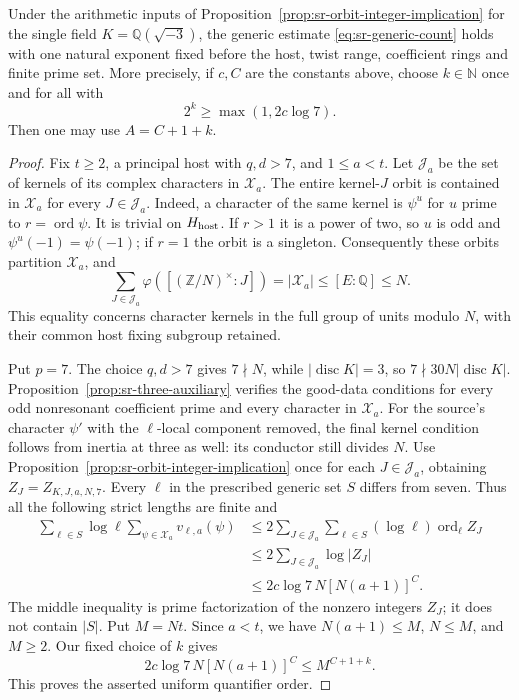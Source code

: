 \begin{srproposition}
\label{prop:sr-fixed-seven-generic}
Under the arithmetic inputs of
Proposition~\ref{prop:sr-orbit-integer-implication} for the single field
$K=\mathbb Q(\sqrt{-3})$, the generic estimate
\eqref{eq:sr-generic-count} holds with one natural exponent fixed
before the host, twist range, coefficient rings and finite prime set.
More precisely, if $c,C$ are the constants above, choose
$k\in\mathbb N$ once and for all with
\[
                2^k\ge\max(1,2c\log7).
\]
Then one may use $A=C+1+k$.
\end{srproposition}
\begin{proof}
Fix $t\ge2$, a principal host with $q,d>7$, and $1\le a<t$.
Let $\mathcal J_a$ be the set of kernels of its complex characters
in $\mathcal X_a$. The entire kernel-$J$ orbit is contained in
$\mathcal X_a$ for every $J\in\mathcal J_a$.
Indeed, a character of the same kernel is $\psi^u$ for $u$ prime to
$r=\operatorname{ord}\psi$. It is trivial on $H_{\rm host}$.
If $r>1$ it is a power of two, so $u$ is odd and
$\psi^u(-1)=\psi(-1)$; if $r=1$ the orbit is a singleton.
Consequently these orbits partition $\mathcal X_a$, and
\begin{equation}\label{eq:sr-orbit-totient-sum}
 \sum_{J\in\mathcal J_a}
           \varphi([(\mathbb Z/N)^\times:J])
             =|\mathcal X_a|\le[E:\mathbb Q]\le N.
\end{equation}
This equality concerns character kernels in the full group of units
modulo $N$, with their common host fixing subgroup retained.

Put $p=7$. The choice $q,d>7$ gives $7\nmid N$, while
$|\operatorname{disc}K|=3$, so $7\nmid30N|\operatorname{disc}K|$.
Proposition~\ref{prop:sr-three-auxiliary} verifies the good-data
conditions for every odd nonresonant coefficient prime and every
character in $\mathcal X_a$. For the source's character $\psi'$ with
the $\ell$-local component removed, the final kernel condition follows
from inertia at three as well: its conductor still divides $N$.
Use Proposition~\ref{prop:sr-orbit-integer-implication} once for
each $J\in\mathcal J_a$, obtaining $Z_J=Z_{K,J,a,N,7}$.
Every $\ell$ in the prescribed generic set $S$ differs from seven.
Thus all the following strict lengths are finite and
\begin{align*}
 \sum_{\ell\in S}\log\ell
                   \sum_{\psi\in\mathcal X_a}v_{\ell,a}(\psi)
 &\le2\sum_{J\in\mathcal J_a}
                     \sum_{\ell\in S}
                      (\log\ell)\operatorname{ord}_\ell Z_J\\
 &\le2\sum_{J\in\mathcal J_a}\log|Z_J|\\
 &\le2c\log7\,N[N(a+1)]^C .
\end{align*}
The middle inequality is prime factorization of the nonzero integers
$Z_J$; it does not contain $|S|$.
Put $M=Nt$. Since $a<t$, we have $N(a+1)\le M$, $N\le M$,
and $M\ge2$. Our fixed choice of $k$ gives
\[
        2c\log7\,N[N(a+1)]^C
                         \le M^{C+1+k}.
\]
This proves the asserted uniform quantifier order.
\end{proof}

